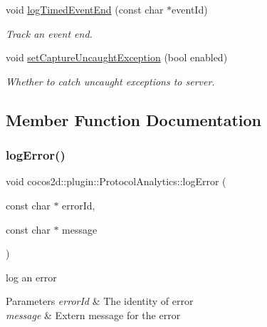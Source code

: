 \begin{DoxyCompactItemize}
void \hyperlink{classcocos2d_1_1plugin_1_1ProtocolAnalytics_a019f1e89d75c6f4c6cf89c28aad9a098}{log\+Timed\+Event\+End} (const char $\ast$event\+Id)
\begin{DoxyCompactList}\small\item\em Track an event end. \end{DoxyCompactList}\item 
void \hyperlink{classcocos2d_1_1plugin_1_1ProtocolAnalytics_ae51f9264d28735701d38d45b947f76b8}{set\+Capture\+Uncaught\+Exception} (bool enabled)
\begin{DoxyCompactList}\small\item\em Whether to catch uncaught exceptions to server. \end{DoxyCompactList}\end{DoxyCompactItemize}


\subsection{Member Function Documentation}
\mbox{\label{classcocos2d_1_1plugin_1_1ProtocolAnalytics_acc95ad8a3c0c2e3a195605e515a9ee59}} 
\subsubsection{\texorpdfstring{log\+Error()}{logError()}}
{\footnotesize\ttfamily void cocos2d\+::plugin\+::\+Protocol\+Analytics\+::log\+Error (\begin{DoxyParamCaption}\item[{const char $\ast$}]{error\+Id,  }\item[{const char $\ast$}]{message }\end{DoxyParamCaption})}



log an error 


\begin{DoxyParams}{Parameters}
{\em error\+Id} & The identity of error \\
\hline
{\em message} & Extern message for the error \\
\hline
\end{DoxyParams}
\mbox{\label{classcocos2d_1_1plugin_1_1ProtocolAnalytics_a67758ef2c55576858a04b1df3a587b5e}} 
